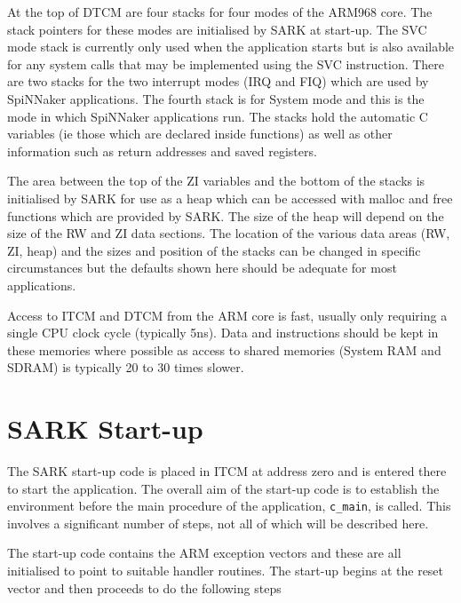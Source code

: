 At the top of DTCM are four stacks for four modes of the ARM968 core.
The stack pointers for these modes are initialised by SARK at start-up.
The SVC mode stack is currently only used when the application starts
but is also available for any system calls that may be implemented
using the SVC instruction. There are two stacks for the two interrupt
modes (IRQ and FIQ) which are used by SpiNNaker applications. The
fourth stack is for System mode and this is the mode in which SpiNNaker
applications run. The stacks hold the automatic C variables (ie those
which are declared inside functions) as well as other information such
as return addresses and saved registers.

The area between the top of the ZI variables and the bottom of the
stacks is initialised by SARK for use as a heap which can be accessed
with malloc and free functions which are provided by SARK. The size of
the heap will depend on the size of the RW and ZI data sections. The
location of the various data areas (RW, ZI, heap) and the sizes and
position of the stacks can be changed in specific circumstances but
the defaults shown here should be adequate for most applications.

Access to ITCM and DTCM from the ARM core is fast, usually only
requiring a single CPU clock cycle (typically 5ns). Data and
instructions should be kept in these memories where possible as access
to shared memories (System RAM and SDRAM) is typically 20 to 30 times
slower.

\section{SARK Start-up}

The SARK start-up code is placed in ITCM at address zero and is
entered there to start the application. The overall aim of the
start-up code is to establish the environment before the main
procedure of the application, \texttt{c\_main}, is called. This involves a
significant number of steps, not all of which will be described here.

The start-up code contains the ARM exception vectors and these are all
initialised to point to suitable handler routines. The start-up begins
at the reset vector and then proceeds to do the following steps

